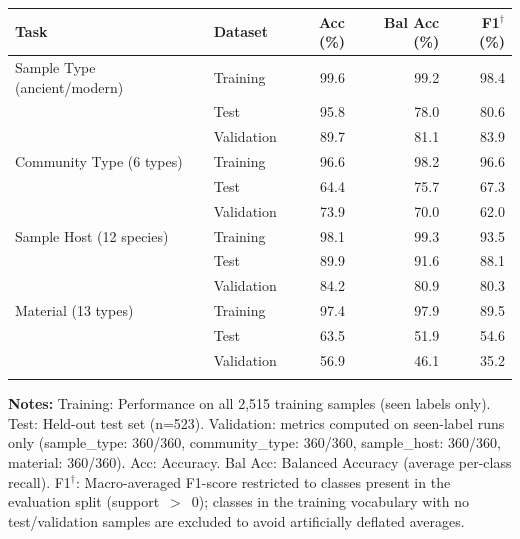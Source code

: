 \centering
\caption{Final model performance across the Training set, the held-out Test set, and the external Validation set. Balanced Accuracy is the unweighted mean of per-class recall. F1$^{\dagger}$ is the macro-averaged F1-score computed only over classes that are represented in the respective evaluation set (i.e.\ excluding training classes with zero samples in that split; see Supplementary Table~\ref{tab:zero_support}).}
\label{tab:performance}
\small
\begin{tabular*}{\linewidth}{@{\extracolsep{\fill}}llrrr@{}}
\toprule
Task & Dataset & Acc (\%) & Bal Acc (\%) & F1$^{\dagger}$ (\%) \\
\midrule
Sample Type (ancient/modern) & Training & 99.6 & 99.2 & 98.4 \\
 & Test & 95.8 & 78.0 & 80.6 \\
 & Validation & 89.7 & 81.1 & 83.9 \\
\addlinespace
Community Type (6 types) & Training & 96.6 & 98.2 & 96.6 \\
 & Test & 64.4 & 75.7 & 67.3 \\
 & Validation & 73.9 & 70.0 & 62.0 \\
\addlinespace
Sample Host (12 species) & Training & 98.1 & 99.3 & 93.5 \\
 & Test & 89.9 & 91.6 & 88.1 \\
 & Validation & 84.2 & 80.9 & 80.3 \\
\addlinespace
Material (13 types) & Training & 97.4 & 97.9 & 89.5 \\
 & Test & 63.5 & 51.9 & 54.6 \\
 & Validation & 56.9 & 46.1 & 35.2 \\
\addlinespace
\bottomrule
\end{tabular*}
\par\vspace{4pt}
\parbox{\linewidth}{\footnotesize \textbf{Notes:} Training: Performance on all 2,515 training samples (seen labels only). Test: Held-out test set (n=523). Validation: metrics computed on seen-label runs only (sample\_type: 360/360, community\_type: 360/360, sample\_host: 360/360, material: 360/360). Acc: Accuracy. Bal Acc: Balanced Accuracy (average per-class recall). F1$^{\dagger}$: Macro-averaged F1-score restricted to classes present in the evaluation split (support~$>$~0); classes in the training vocabulary with no test/validation samples are excluded to avoid artificially deflated averages.}